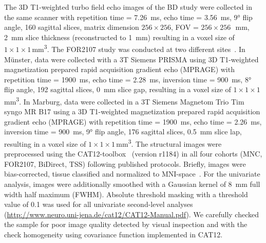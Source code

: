 \documentclass{article}
\begin{document}
    The 3D T1-weighted turbo field echo images of the BD study were collected in the same scanner with repetition time = \SI{7.26}{\milli\second}, echo time = \SI{3.56}{\milli\second}, \ang{9} flip angle, 160 sagittal slices, matrix dimension $256 \times 256$, FOV = $256 \times 256$\,\si{\squared\milli\meter}, \SI{2}{\milli\meter} slice thickness (reconstructed to \SI{1}{\milli\meter}) resulting in a voxel size of $1 \times 1 \times 1$\,\si{\cubic\milli\meter}.
    The FOR2107 study was conducted at two different sites~\cite{Vogelbacher2018}. In Münster, data were collected with a 3T Siemens PRISMA using 3D T1-weighted magnetization prepared rapid acquisition gradient echo (MPRAGE) with repetition time = \SI{1900}{\milli\second}, echo time = \SI{2.28}{\milli\second}, inversion time = \SI{900}{\milli\second}, \ang{8} flip angle, 192 sagittal slices, \SI{0}{\milli\meter} slice gap, resulting in a voxel size of $1 \times 1 \times 1$\,\si{\cubic\milli\meter}. In Marburg, data were collected in a 3T Siemens Magnetom Trio Tim syngo MR B17 using a 3D T1-weighted magnetization prepared rapid acquisition gradient echo (MPRAGE) with repetition time = \SI{1900}{\milli\second}, echo time = \SI{2.26}{\milli\second}, inversion time = \SI{900}{\milli\second}, \ang{9} flip angle, 176 sagittal slices, \SI{0.5}{\milli\meter} slice lap, resulting in a voxel size of $1 \times 1 \times 1$\,\si{\cubic\milli\meter}.
    The structural images were preprocessed using the CAT12-toolbox~\cite{Gaser} (version r1184) in all four cohorts (MNC, FOR2107, BiDirect, TSS) following published protocols. Briefly, images were bias-corrected, tissue classified and normalized to MNI-space~\cite{Tzourio-Mazoyer2002}. For the univariate analysis, images were additionally smoothed with a Gaussian kernel of \SI{8}{\milli\meter} full width half maximum (FWHM). Absolute threshold masking with a threshold value of 0.1 was used for all univariate second-level analyses (\url{http://www.neuro.uni-jena.de/cat12/CAT12-Manual.pdf}). We carefully checked the sample for poor image quality detected by visual inspection and with the check homogeneity using covariance function implemented in CAT12.
\end{document}
